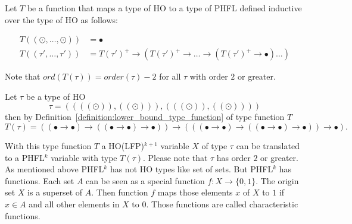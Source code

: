 \begin{definition}
    \label{definition:lower_bound_type_function}
    Let $T$ be a function that maps a type of HO to a type of PHFL defined inductive over the type
    of HO as follows:

    \begin{align*}
        T((\odot, \dots, \odot)) &= \bullet\\
        T((\tau', \dots, \tau')) &= T(\tau')^+ \rightarrow (T(\tau')^+ \rightarrow \dots \rightarrow (T(\tau')^+
        \rightarrow \bullet) \dots )
    \end{align*}
\end{definition}

Note that $ord(T(\tau)) = order(\tau) - 2$ for all $\tau$ with order $2$ or greater.

\begin{example}
    Let $\tau$ be a type of HO
    \[\tau = ((((\odot)), ((\odot))), (((\odot)), ((\odot))))\]
    then by Definition~\ref{definition:lower_bound_type_function} of type function $T$
    \[T(\tau) = ((\bullet \rightarrow \bullet) \rightarrow ((\bullet \rightarrow \bullet) \rightarrow \bullet))
    \rightarrow (((\bullet \rightarrow \bullet) \rightarrow ((\bullet \rightarrow \bullet) \rightarrow \bullet))
    \rightarrow \bullet).\]
\end{example}

With this type function $T$ a HO(LFP)$^{k + 1}$ variable $X$ of type $\tau$ can be translated to a PHFL$^k$ variable
with type $T(\tau)$. Please note that $\tau$ has order $2$ or greater. As mentioned above PHFL$^k$ has not HO types like
set of sets. But PHFL$^k$ has functions. Each set $A$ can be seen as a special function $f\colon X \rightarrow \{0,
1\}$. The origin set $X$ is a superset of $A$. Then function $f$ maps those elements $x$ of $X$ to $1$ if $x \in A$
and all other elements in $X$ to $0$. Those functions are called characteristic functions.

